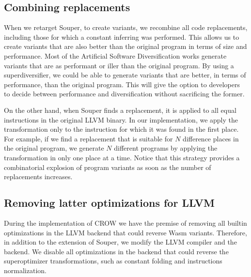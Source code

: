 \subsection*{Combining replacements}

When we retarget Souper, to create variants, we recombine all code replacements, including those for which a constant inferring was performed.
This allows us to create variants that are also better than the original program in terms of size and performance. Most of the Artificial Software Diversification  works generate variants that are as performant or iller than the original program. By using a superdiversifier, we could be able to generate variants that are better, in terms of performance, than the original program. This will give the option to developers to decide between performance and diversification without sacrificing the former. 

On the other hand, when Souper finds a replacement, it is applied to all equal instructions in the original LLVM binary. In our implementation, we apply the transformation only to the instruction for which it was found in the first place. For example, if we find a replacement that is suitable for $N$ difference places in the original program, we generate $N$ different programs by applying the transformation in only one place at a time. Notice that this strategy provides a combinatorial explosion of program variants as soon as the number of replacements increases.

\subsection*{Removing latter optimizations for LLVM}

During the implementation of CROW we have the premise of removing all builtin optimizations in the LLVM backend that could reverse Wasm  variants.
Therefore, in addition to the extension of Souper, we modify the LLVM compiler and the \wasm backend.
We disable all optimizations in the \wasm backend that could reverse the superoptimizer transformations, such as constant folding and instructions normalization.




